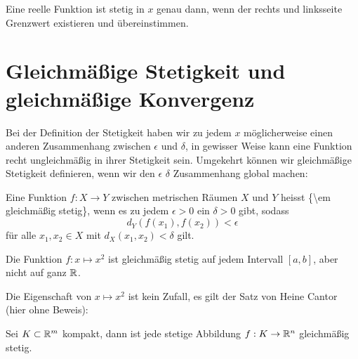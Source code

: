 Eine reelle Funktion ist stetig in \(x\) genau dann, wenn der rechts  und linksseite Grenzwert existieren und übereinstimmen.


\section{Gleichmäßige Stetigkeit und gleichmäßige Konvergenz}
\label{\detokenize{stetigkeit/glm:gleichmaszige-stetigkeit-und-gleichmaszige-konvergenz}}\label{\detokenize{stetigkeit/glm::doc}}
Bei der Definition der Stetigkeit haben wir zu jedem \(x\) möglicherweise einen anderen Zusammenhang zwischen \(\epsilon\) und \(\delta\), in gewisser Weise kann eine Funktion recht ungleichmäßig in ihrer Stetigkeit sein. Umgekehrt können wir gleichmäßige Stetigkeit definieren, wenn wir den \(\epsilon\) \(\delta\) Zusammenhang global machen:
\label{stetigkeit/glm:definition-0}
\begin{definition}{}{}



Eine Funktion \(f: X\rightarrow Y\) zwischen metrischen Räumen \(X\) und \(Y\) heisst \{\textbackslash{}em gleichmäßig stetig\}, wenn es zu jedem \(\epsilon > 0\) ein \(\delta > 0\) gibt, sodass
\begin{equation*}
 d_Y(f(x_1),f(x_2)) < \epsilon
\end{equation*}
für alle \(x_1,x_2 \in X\) mit \(d_X(x_1,x_2) < \delta\) gilt.
\end{definition}
\label{stetigkeit/glm:example-1}
\begin{example}{}{}



Die Funktion \(f:x \mapsto x^2\) ist gleichmäßig stetig auf jedem Intervall \([a,b]\), aber nicht auf ganz \(\mathbb{R}\).
\end{example}

Die Eigenschaft von \(x \mapsto x^2\) ist kein Zufall, es gilt der Satz von Heine Cantor (hier ohne Beweis):
\label{stetigkeit/glm:theorem-2}
\begin{theorem}{}{}



Sei \(K \subset \mathbb{R}^m\) kompakt, dann ist jede stetige Abbildung \(f:K \rightarrow \mathbb{R}^n\) gleichmäßig stetig.
\end{theorem}

